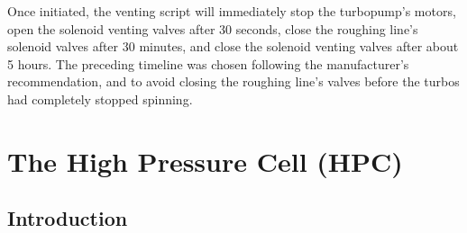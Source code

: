 Once initiated, the venting script will immediately stop the turbopump's motors, open the solenoid venting valves after 30 seconds, close the roughing line's solenoid valves after 30 minutes, and close the solenoid venting valves after about 5 hours. The preceding timeline was chosen following the manufacturer's recommendation, and to avoid closing the roughing line's valves before the turbos had completely stopped spinning. 
%
%
%
%
%
%
%
%

\section{The High Pressure Cell (HPC)}
\label{app:HPC_instructions}

\subsection{Introduction}

